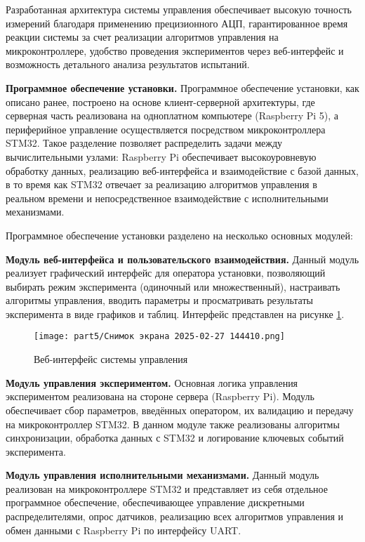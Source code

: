 Разработанная архитектура системы управления обеспечивает высокую точность измерений благодаря
применению прецизионного АЦП, гарантированное время реакции системы за счет реализации
алгоритмов управления на микроконтроллере, удобство проведения экспериментов
через веб-интерфейс и возможность детального анализа результатов испытаний.

\textbf{Программное обеспечение установки.}
Программное обеспечение установки, как описано ранее, построено на основе клиент-серверной архитектуры,
где серверная часть реализована на одноплатном компьютере (Raspberry Pi 5), а периферийное
управление осуществляется посредством микроконтроллера STM32. Такое разделение позволяет
распределить задачи между вычислительными узлами: Raspberry Pi обеспечивает высокоуровневую
обработку данных, реализацию веб-интерфейса и взаимодействие с базой данных, в то время как
STM32 отвечает за реализацию алгоритмов управления в реальном времени и непосредственное
взаимодействие с исполнительными механизмами.

Программное обеспечение установки разделено на несколько основных модулей:

\textbf{Модуль веб-интерфейса и пользовательского взаимодействия.} Данный модуль реализует графический интерфейс для оператора
установки, позволяющий выбирать режим эксперимента (одиночный или множественный), настраивать алгоритмы управления,
вводить параметры и просматривать результаты эксперимента в виде графиков и таблиц.
Интерфейс представлен на рисунке \ref{fig:web_interface}.

\begin{figure}[ht]
	\centering
	\texttt{[image: part5/Снимок экрана 2025-02-27 144410.png]}
	\caption{Веб-интерфейс системы управления}
	\label{fig:web_interface}
\end{figure}

\textbf{Модуль управления экспериментом.} Основная логика управления экспериментом реализована на стороне сервера
(Raspberry Pi). Модуль обеспечивает сбор параметров, введённых оператором, их валидацию и передачу на микроконтроллер STM32.
В данном модуле также реализованы алгоритмы синхронизации, обработка данных с STM32 и логирование
ключевых событий эксперимента.

\textbf{Модуль управления исполнительными механизмами.} Данный модуль реализован на микроконтроллере STM32 и
представляет из себя отдельное программное обеспечение, обеспечивающее управление дискретными распределителями,
опрос датчиков, реализацию всех алгоритмов управления и обмен данными с Raspberry Pi по интерфейсу UART.

